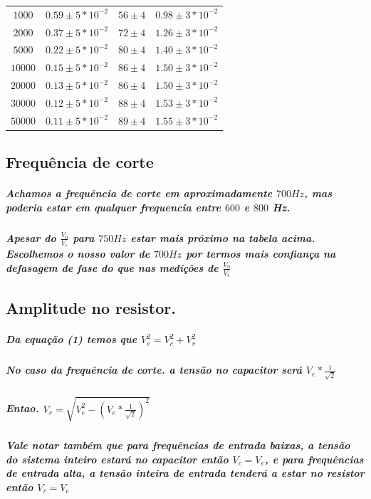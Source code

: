 \documentclass[12pt,twoside, a4paper, twocolumn]{article}
\begin{document}
\begin{center}
\begin{tabular}{ |c|c|c|c| }
    $1000$   & $0.59 \pm 5 * 10^{-2}$  & $56 \pm 4$     & $0.98 \pm 3 * 10^{-2}$ \\
    $2000$   & $0.37 \pm 5 * 10^{-2}$  & $72 \pm 4$     & $1.26 \pm 3 * 10^{-2}$ \\
    $5000$   & $0.22 \pm 5 * 10^{-2}$  & $80 \pm 4$     & $1.40 \pm 3 * 10^{-2}$ \\
    $10000$  & $0.15 \pm 5 * 10^{-2}$  & $86 \pm 4$     & $1.50 \pm 3 * 10^{-2}$ \\
    $20000$  & $0.13 \pm 5 * 10^{-2}$  & $86 \pm 4$     & $1.50 \pm 3 * 10^{-2}$ \\
    $30000$  & $0.12 \pm 5 * 10^{-2}$  & $88 \pm 4$     & $1.53 \pm 3 * 10^{-2}$ \\
    $50000$  & $0.11 \pm 5 * 10^{-2}$  & $89 \pm 4$     & $1.55 \pm 3 * 10^{-2}$ \\

    \hline
  \end{tabular}
\end{center}

\subsection{Frequência de corte}

\subparagraph*{Achamos a frequência de corte em aproximadamente $700Hz$, mas poderia estar em qualquer frequencia entre $600$ e $800$ Hz.}

\subparagraph*{Apesar do $\frac{V_0}{V_e}$ para $750Hz$ estar mais próximo na tabela acima. Escolhemos o nosso valor de $700Hz$ por termos  mais confiança na defasagem de fase do que nas medições de $\frac{V_0}{V_e}$}

\subsection{Amplitude no resistor.}

\subparagraph*{Da equação (1) temos que $V_e^2 = V_c^2 + V_r^2$}

\subparagraph*{No caso da frequência de corte. a tensão no capacitor será $V_e*\frac{1}{\sqrt{2}}$}

\subparagraph*{Entao. $V_r = \sqrt{V_e^2 - \left(V_e*\frac{1}{\sqrt{2}}\right)^2 }$}

\subparagraph*{Vale notar também que para frequências de entrada baixas, a tensão do sistema inteiro estará no capacitor então $V_c = V_e$, e para frequências de entrada alta, a tensão inteira de entrada tenderá a estar no resistor então $V_r = V_e$}
\end{document}
